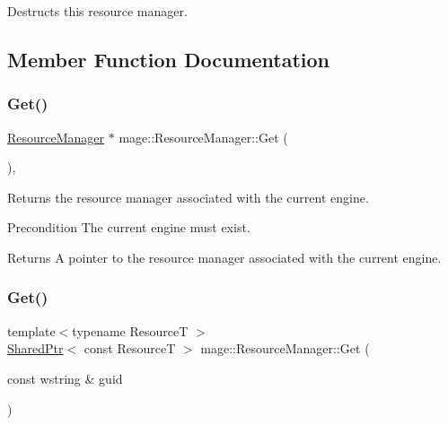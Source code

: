 Destructs this resource manager. 

\subsection{Member Function Documentation}
\hypertarget{classmage_1_1_resource_manager_a1e6ca77d892578fc4df0e62dfbc807f6}{}\label{classmage_1_1_resource_manager_a1e6ca77d892578fc4df0e62dfbc807f6} 
\subsubsection{\texorpdfstring{Get()}{Get()}\hspace{0.1cm}{\footnotesize\ttfamily [1/2]}}
{\footnotesize\ttfamily \hyperlink{classmage_1_1_resource_manager}{Resource\+Manager} $\ast$ mage\+::\+Resource\+Manager\+::\+Get (\begin{DoxyParamCaption}{ }\end{DoxyParamCaption})\hspace{0.3cm}{\ttfamily [static]}, {\ttfamily [noexcept]}}

Returns the resource manager associated with the current engine.

\begin{DoxyPrecond}{Precondition}
The current engine must exist. 
\end{DoxyPrecond}
\begin{DoxyReturn}{Returns}
A pointer to the resource manager associated with the current engine. 
\end{DoxyReturn}
\hypertarget{classmage_1_1_resource_manager_a2888fcd54840af47d7ebf6fee8a9d56c}{}\label{classmage_1_1_resource_manager_a2888fcd54840af47d7ebf6fee8a9d56c} 
\subsubsection{\texorpdfstring{Get()}{Get()}\hspace{0.1cm}{\footnotesize\ttfamily [2/2]}}
{\footnotesize\ttfamily template$<$typename ResourceT $>$ \\
\hyperlink{namespacemage_a1e01ae66713838a7a67d30e44c67703e}{Shared\+Ptr}$<$ const ResourceT $>$ mage\+::\+Resource\+Manager\+::\+Get (\begin{DoxyParamCaption}\item[{const wstring \&}]{guid }\end{DoxyParamCaption})\hspace{0.3cm}{\ttfamily [noexcept]}}

